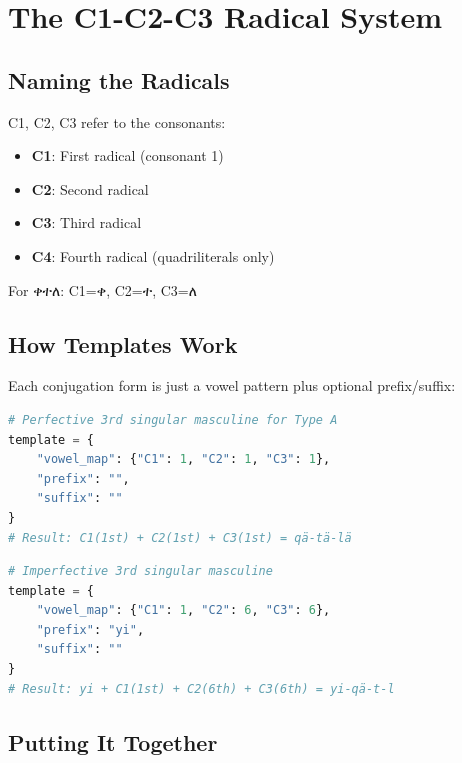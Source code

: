 \documentclass[conference]{IEEEtran}
\newcommand{\geez}[1]{{\ethiopicfont #1}}
\begin{document}
\section{The C1-C2-C3 Radical System}

\subsection{Naming the Radicals}

C1, C2, C3 refer to the consonants:
\begin{itemize}
    \item \textbf{C1}: First radical (consonant 1)
    \item \textbf{C2}: Second radical
    \item \textbf{C3}: Third radical
    \item \textbf{C4}: Fourth radical (quadriliterals only)
\end{itemize}

For \geez{ቀተለ}: C1=\geez{ቀ}, C2=\geez{ተ}, C3=\geez{ለ}

\subsection{How Templates Work}

Each conjugation form is just a vowel pattern plus optional prefix/suffix:

\begin{lstlisting}[language=Python]
# Perfective 3rd singular masculine for Type A
template = {
    "vowel_map": {"C1": 1, "C2": 1, "C3": 1},
    "prefix": "",
    "suffix": ""
}
# Result: C1(1st) + C2(1st) + C3(1st) = qä-tä-lä
\end{lstlisting}

\begin{lstlisting}[language=Python]
# Imperfective 3rd singular masculine
template = {
    "vowel_map": {"C1": 1, "C2": 6, "C3": 6},
    "prefix": "yi",
    "suffix": ""
}
# Result: yi + C1(1st) + C2(6th) + C3(6th) = yi-qä-t-l
\end{lstlisting}

\subsection{Putting It Together}
\end{document}
